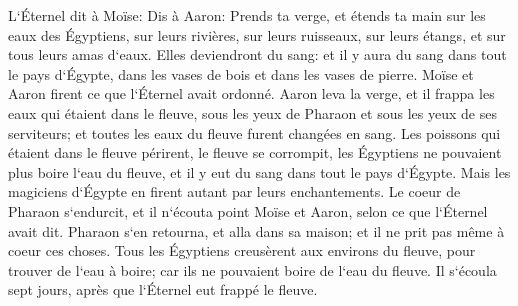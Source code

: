 \verse L`Éternel dit à Moïse: Dis à Aaron: Prends ta verge, et étends ta main sur les eaux des Égyptiens, sur leurs rivières, sur leurs ruisseaux, sur leurs étangs, et sur tous leurs amas d`eaux. Elles deviendront du sang: et il y aura du sang dans tout le pays d`Égypte, dans les vases de bois et dans les vases de pierre. 
\verse Moïse et Aaron firent ce que l`Éternel avait ordonné. Aaron leva la verge, et il frappa les eaux qui étaient dans le fleuve, sous les yeux de Pharaon et sous les yeux de ses serviteurs; et toutes les eaux du fleuve furent changées en sang. 
\verse Les poissons qui étaient dans le fleuve périrent, le fleuve se corrompit, les Égyptiens ne pouvaient plus boire l`eau du fleuve, et il y eut du sang dans tout le pays d`Égypte. 
\verse Mais les magiciens d`Égypte en firent autant par leurs enchantements. Le coeur de Pharaon s`endurcit, et il n`écouta point Moïse et Aaron, selon ce que l`Éternel avait dit. 
\verse Pharaon s`en retourna, et alla dans sa maison; et il ne prit pas même à coeur ces choses. 
\verse Tous les Égyptiens creusèrent aux environs du fleuve, pour trouver de l`eau à boire; car ils ne pouvaient boire de l`eau du fleuve. 
\verse Il s`écoula sept jours, après que l`Éternel eut frappé le fleuve. 

